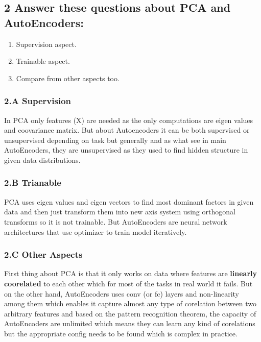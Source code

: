 \documentclass[11pt]{article}
\providecommand{\tightlist}{%
      \setlength{\itemsep}{0pt}\setlength{\parskip}{0pt}}
\begin{document}
    \hypertarget{answer-these-questions-about-pca-and-autoencoders}{%
\subsection{2 Answer these questions about PCA and
AutoEncoders:}\label{answer-these-questions-about-pca-and-autoencoders}}

\begin{enumerate}
\def\labelenumi{\arabic{enumi}.}
\tightlist
\item
  Supervision aspect.
\item
  Trainable aspect.
\item
  Compare from other aspects too.
\end{enumerate}

    \hypertarget{a-supervision}{%
\subsubsection{2.A Supervision}\label{a-supervision}}

In PCA only features (X) are needed as the only computations are eigen
values and coovariance matrix. But about Autoencoders it can be both
supervised or unsupervised depending on task but generally and as what
see in main AutoEncoders, they are unsupervised as they used to find
hidden structure in given data distributions.

    \hypertarget{b-trianable}{%
\subsubsection{2.B Trianable}\label{b-trianable}}

PCA uses eigen values and eigen vectors to find most dominant factors in
given data and then just transform them into new axis system using
orthogonal transforms so it is not trainable. But AutoEncoders are
neural network architectures that use optimizer to train model
iteratively.

    \hypertarget{c-other-aspects}{%
\subsubsection{2.C Other Aspects}\label{c-other-aspects}}

First thing about PCA is that it only works on data where features are
\textbf{linearly coorelated} to each other which for most of the tasks
in real world it fails. But on the other hand, AutoEncoders uses conv
(or fc) layers and non-linearity among them which enables it capture
almost any type of corelation between two arbitrary features and based
on the pattern recognition theorem, the capacity of AutoEncoders are
unlimited which means they can learn any kind of corelations but the
appropriate config needs to be found which is complex in practice.
\end{document}
